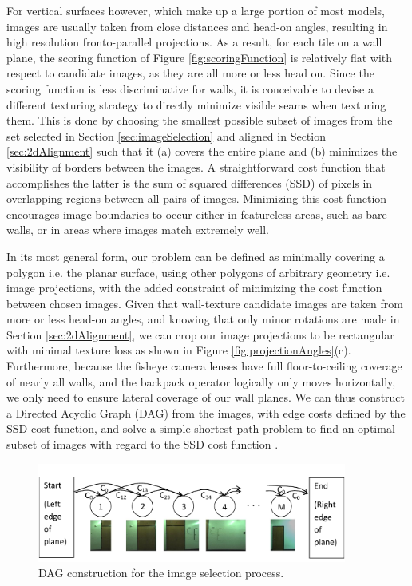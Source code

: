 \documentclass[]{spie}  %
\begin{document}
For vertical surfaces however, which make up a large portion of most
models, images are usually taken from close distances and head-on
angles, resulting in high resolution fronto-parallel projections. As a
result, for each tile on a wall plane, the scoring function of Figure
\ref{fig:scoringFunction} is relatively flat with respect to candidate
images, as they are all more or less head on. Since the scoring
function is less discriminative for walls, it is conceivable to devise
a different texturing strategy to directly minimize visible seams when
texturing them. This is done by choosing the smallest possible subset
of images from the set selected in Section \ref{sec:imageSelection}
and aligned in Section \ref{sec:2dAlignment} such that it (a) covers
the entire plane and (b) minimizes the visibility of borders between
the images. A straightforward cost function that accomplishes the
latter is the sum of squared differences (SSD) of pixels in
overlapping regions between all pairs of images. Minimizing this cost
function encourages image boundaries to occur either in featureless
areas, such as bare walls, or in areas where images match extremely
well.

In its most general form, our problem can be defined as minimally
covering a polygon i.e. the planar surface, using other polygons of
arbitrary geometry i.e. image projections, with the added constraint
of minimizing the cost function between chosen images. Given that
wall-texture candidate images are taken from more or less head-on
angles, and knowing that only minor rotations are made in Section
\ref{sec:2dAlignment}, we can crop our image projections to be
rectangular with minimal texture loss as shown in Figure
\ref{fig:projectionAngles}(c). Furthermore, because the fisheye camera
lenses have full floor-to-ceiling coverage of nearly all walls, and
the backpack operator logically only moves horizontally, we only need
to ensure lateral coverage of our wall planes. We can thus construct a
Directed Acyclic Graph (DAG) from the images, with edge costs defined
by the SSD cost function, and solve a simple shortest path problem to
find an optimal subset of images with regard to the SSD cost function
\cite{dijkstra}.

\begin{figure}
  \centering
  \includegraphics[width=4in]{dagCreation.pdf}
  \caption{DAG construction for the image selection process. \\}
  \label{fig:dagCreation}
\end{figure}
\end{document}
